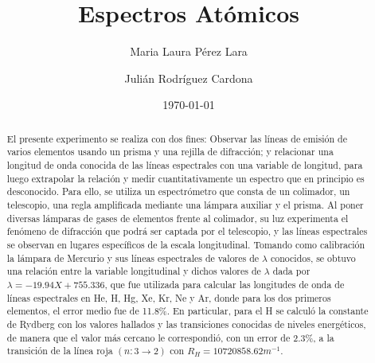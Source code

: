 \documentclass[%
 reprint,
 amsmath,amssymb,
 aps,
]{revtex4-1}
\begin{document}

\title{Espectros Atómicos}%

\author{Maria Laura Pérez Lara}
\author{Julián Rodríguez Cardona}%
%


\date{\today}%

\begin{abstract}
El presente experimento se realiza con dos fines: Observar las líneas de emisión de varios elementos usando un prisma y una rejilla de difracción; y relacionar una longitud de onda conocida de las líneas espectrales con una variable de longitud, para luego extrapolar la relación y medir cuantitativamente un espectro que en principio es desconocido. Para ello, se utiliza un espectrómetro que consta de un colimador, un telescopio, una regla amplificada mediante una lámpara auxiliar y el prisma. Al poner diversas lámparas de gases de elementos frente al colimador, su luz experimenta el fenómeno de difracción que podrá ser captada por el telescopio, y las líneas espectrales se observan en lugares específicos de la escala longitudinal. Tomando como calibración la lámpara de Mercurio y sus líneas espectrales de valores de $\lambda$ conocidos, se obtuvo una relación entre la variable longitudinal y dichos valores de $\lambda$ dada por $\lambda = -19.94X+755.336$, que fue utilizada para calcular las longitudes de onda de líneas espectrales en He, H, Hg, Xe, Kr, Ne y Ar, donde para los dos primeros elementos, el error medio fue de 11.8\%. En particular, para el H se calculó la constante de Rydberg con los valores hallados y las transiciones conocidas de niveles energéticos, de manera que el valor más cercano le correspondió, con un error de 2.3\%, a la transición de la línea roja $(n: 3 \rightarrow 2)$ con $R_H= 10720858.62 m^{-1}$. 

\end{abstract}

\maketitle

\end{document}
